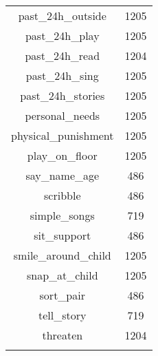 \begin{table}[!htbp]
\begin{tabular}{@{\extracolsep{5pt}} cc}
past\_24h\_outside & 1205 \\ 
past\_24h\_play & 1205 \\ 
past\_24h\_read & 1204 \\ 
past\_24h\_sing & 1205 \\ 
past\_24h\_stories & 1205 \\ 
personal\_needs & 1205 \\ 
physical\_punishment & 1205 \\ 
play\_on\_floor & 1205 \\ 
say\_name\_age &  486 \\ 
scribble &  486 \\ 
simple\_songs &  719 \\ 
sit\_support &  486 \\ 
smile\_around\_child & 1205 \\ 
snap\_at\_child & 1205 \\ 
sort\_pair &  486 \\ 
tell\_story &  719 \\ 
threaten & 1204 \\ 
\hline \\[-1.8ex] 
\end{tabular} 
\end{table} 
